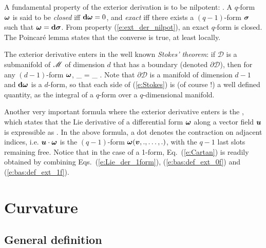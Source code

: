 A fundamental property of the exterior derivation is to be nilpotent:
\be \label{e:ext_der_nilpot}
	.
\ee
A $q$-form $\bm{\omega}$ is said to be \emph{closed} iff $\mathbf{d}\bm{\omega}=0$,
and \emph{exact} iff there exists a $(q-1)$-form $\bm{\sigma}$ such that
$\bm{\omega} = \mathbf{d}\bm{\sigma}$. From property (\ref{e:ext_der_nilpot}),
an exact $q$-form is closed. The Poincar\'e lemma states that the converse is true,
at least locally.

The exterior derivative enters in the well known \emph{Stokes' theorem}: if $\mathcal{D}$
is a submanifold of $\mathscr{M}$ of dimension $d$ that has a boundary (denoted $\partial\mathcal{D}$), then for any $(d-1)$-form $\bm{\omega}$,
\be \label{e:Stokes}
	\oint_{\partial{}} \w{\omega} =
	\int_{} \dd\w{\omega} .
\ee
Note that $\partial\mathcal{D}$ is a manifold of dimension $d-1$ and
$\mathbf{d}\bm{\omega}$ is a $d$-form, so that each side of
(\ref{e:Stokes}) is (of course !) a well defined quantity,
as the integral of a $q$-form over a $q$-dimensional manifold.

Another very important formula where the exterior derivative enters is
the , which states that the
Lie derivative of a differential form
$\bm{\omega}$ along a vector field $\bm{u}$ is expressible as
\be \label{e:Cartan}
	.
\ee
In the above formula, a dot denotes the contraction on adjacent indices, i.e.
$\bm{u}\cdot\bm{\omega}$ is the $(q-1)$-form $\bm{\omega}(\bm{v},.,\ldots,.)$,
with the $q-1$ last slots remaining free. Notice that in
the case of a 1-form, Eq.~(\ref{e:Cartan}) is readily obtained
by combining Eqs.~(\ref{e:Lie_der_1form}),
(\ref{e:bas:def_ext_0f}) and (\ref{e:bas:def_ext_1f}).


\section{Curvature} \label{s:bas:curvat}

\subsection{General definition}


